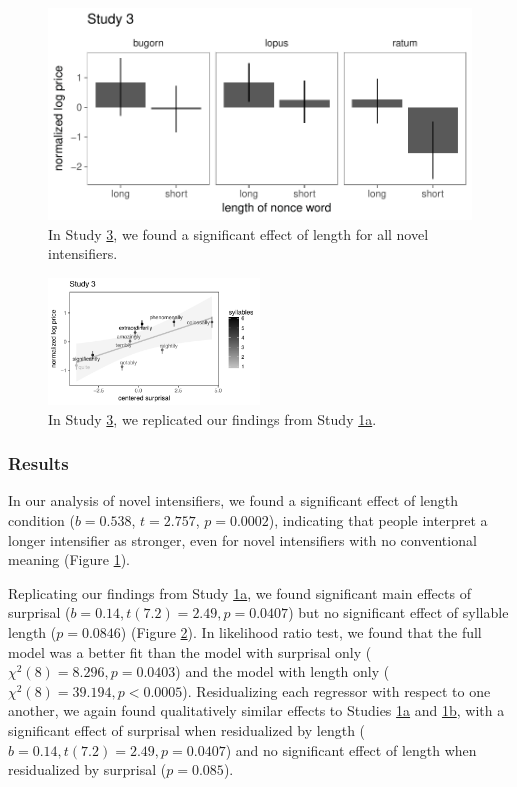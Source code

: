 \begin{figure}[hbt]
\begin{center}
\includegraphics[width=.5\textwidth]{images/plot_study3_A.pdf}
\end{center}
\caption{In Study \hyperref[sec:study3]{3}, we found a significant effect of length for all novel intensifiers.} 
\label{fig:plot_study3_barplot}
\end{figure}

\begin{figure}[hbt]
\begin{center}
\includegraphics[width=0.5\textwidth]{images/plot_study3_B.pdf}
\end{center}
\caption{In Study \hyperref[sec:study3]{3}, we replicated our findings from Study \hyperref[sec:study1a]{1a}.}
\label{fig:plot_study3_scatter}
\end{figure}

\subsubsection{Results}

In our analysis of novel intensifiers, we found a significant effect of length condition ($b=0.538$, $t=2.757$, $p=0.0002$), indicating that people interpret a longer intensifier as stronger, even for novel intensifiers with no conventional meaning (Figure \ref{fig:plot_study3_barplot}).

Replicating our findings from Study \hyperref[sec:study1a]{1a}, we found significant main effects of surprisal ($b=0.14,t(7.2)=2.49,p=0.0407$) but no significant effect of syllable length ($p=0.0846$) (Figure \ref{fig:plot_study3_scatter}). In likelihood ratio test, we found that the full model was a better fit than the model with surprisal only ($\chi^2(8)=8.296,p=0.0403$) and the model with length only ($\chi^2(8)=39.194,p<0.0005$). Residualizing each regressor with respect to one another, we again found qualitatively similar effects to Studies \hyperref[sec:study1a]{1a} and \hyperref[sec:study1b]{1b}, with a significant effect of surprisal when residualized by length ($b=0.14,t(7.2)=2.49,p=0.0407$) and no significant effect of length when residualized by surprisal ($p=0.085$).

